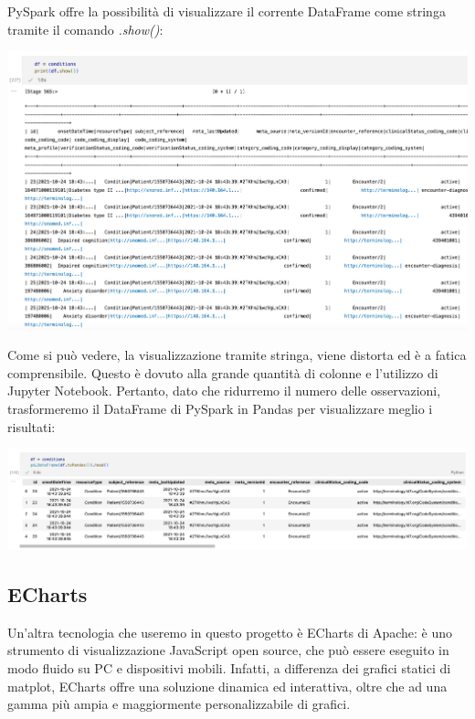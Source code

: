 \documentclass[11pt, oneside]{article}
\begin{document}
PySpark offre la possibilità di visualizzare il corrente DataFrame come stringa tramite il comando \emph{.show()}:

\begin{center}
\includegraphics[scale=0.5]{1_spark.png}
\end{center}

Come si può vedere, la visualizzazione tramite stringa, viene distorta ed è a fatica comprensibile. Questo è dovuto alla grande quantità di colonne e l'utilizzo di Jupyter Notebook. Pertanto, dato che ridurremo il numero delle osservazioni, trasformeremo il DataFrame di PySpark in Pandas per visualizzare meglio i risultati:

\begin{center}
\includegraphics[scale=0.5]{1_pandas.png}
\end{center}


\subsection{ECharts}

Un'altra tecnologia che useremo in questo progetto è ECharts di Apache: è uno strumento di visualizzazione JavaScript open source, che può essere eseguito in modo fluido su PC e dispositivi mobili. Infatti, a differenza dei grafici statici di matplot, ECharts offre una soluzione dinamica ed interattiva, oltre che ad una gamma più ampia e maggiormente personalizzabile di grafici.
\end{document}
